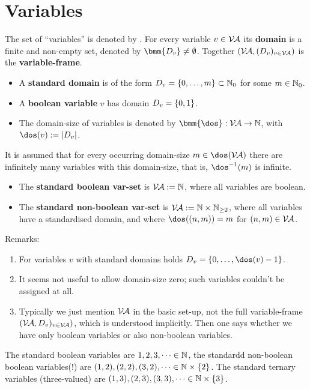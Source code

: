 \documentclass[12pt]{book}
\begin{document}
\section{Variables}
\label{sec:Variables}

\begin{defi}\label{def:var}
      The set of ``variables'' is denoted by \bmm{\Va}. For every variable $v \in \mathcal{V\hspace{-0.1em}A}$ its \textbf{domain} is a finite and non-empty set, denoted by 
	  $\bmm{D_v} \ne \es$. Together $(\mathcal{V\hspace{-0.1em}A}, (D_v)_{v \in \mathcal{V\hspace{-0.1em}A}})$ is the \textbf{variable-frame}.
      \begin{itemize}
            \item A \textbf{standard domain} is of the form $D_v = \{ 0, \dots, m \} \subset \mathbb{N}_0$ for some $m \in \mathbb{N}_0$.
            \item A \textbf{boolean variable} $v$ has domain $D_v = \{ 0,1 \}$.
            \item The domain-size of variables is denoted by $\bmm{\dos}: \Va \ra \NN$, with $\dos(v) := \abs{D_v}$.
      \end{itemize}
      It is assumed that for every occurring domain-size $m \in \dos(\Va)$ there are infinitely many variables with this domain-size, that is, $\dos^{-1}(m)$ is infinite.
      \begin{itemize}
            \item The \textbf{standard boolean var-set} is $\mathcal{V\hspace{-0.1em}A} := \mathbb{N}$, where all variables are boolean.
            \item The \textbf{standard non-boolean var-set} is $\mathcal{V\hspace{-0.1em}A} := \mathbb{N} \times \mathbb{N}_{\ge2}$, where all variables have a standardised domain, and where 
			$\dos((n,m)) = m$ for $(n,m) \in \mathcal{V\hspace{-0.1em}A}$.
      \end{itemize}
\end{defi}
Remarks:
\begin{enumerate}
      \item For variables $v$ with standard domains holds $D_v = \tb{0}{\dos(v)-1}$.
      \item It seems not useful to allow domain-size zero; such variables couldn't be assigned at all.
      \item Typically we just mention $\mathcal{V\hspace{-0.1em}A}$ in the basic set-up, not the full variable-frame $(\mathcal{V\hspace{-0.1em}A},
      D_v)_{v \in \mathcal{V\hspace{-0.1em}A}})$, which is understood implicitly. Then one says whether we have only boolean variables or also non-boolean variables.
\end{enumerate}

\begin{examp}\label{exp:var}
      The standard boolean variables are $1, 2, 3, \dots \in \mathbb{N}$, the standardd non-boolean boolean variables(!) are $(1,2), (2,2), (3,2), \dots \in \mathbb{N} \times \{ 2 \}$. 
	  The standard ternary variables (three-valued) are $(1,3), (2,3), (3,3), \dots \in \mathbb{N} \times \{ 3 \}$.
\end{examp}
\end{document}
